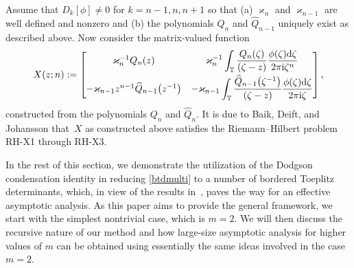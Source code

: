 \documentclass[pdftex]{sigma}
\numberwithin{equation}{section}
\newcommand{\T}{{\mathbb T}}
\newcommand{\ze}{\zeta}
\newcommand{\ii}{{\rm i}}
\newcommand{\dd}{{\rm d}}
\begin{document}
	
	
	Assume that $D_k[\phi] \neq 0$ for $k=n-1, n, n+1$ so that (a) $\varkappa_n$ and $\varkappa_{n-1}$ are well defined and nonzero and (b) the polynomials $Q_n$ and $\widehat{Q}_{n-1}$ uniquely exist as described above. Now consider the matrix-valued function
	\begin{equation}\label{Toeplitz-OP-solution}
		X(z;n):=\begin{bmatrix}
			\varkappa_n^{-1} Q_n(z) & \displaystyle \varkappa^{-1}_n \int_{\T} \frac{Q_n(\ze)}{(\ze-z)} \frac{\phi(\ze)\dd \ze}{2\pi \ii \ze^n} \vspace{1mm}\\
			-\varkappa_{n-1}z^{n-1}\widehat{Q}_{n-1}\big(z^{-1}\big) & \displaystyle -\varkappa_{n-1} \int_{\T} \frac{\widehat{Q}_{n-1}\big(\ze^{-1}\big)}{(\ze-z)} \frac{\phi(\ze)\dd \ze}{2\pi \ii \ze}
		\end{bmatrix},
	\end{equation}
	constructed from the polynomials $Q_n$ and $\widehat{Q}_n$. It is due to Baik, Deift, and Johansson \cite{BDJ} that~$X$ as constructed above satisfies the Riemann--Hilbert problem {\rm RH-X1} through {\rm RH-X3}.
	
In the rest of this section, we demonstrate the utilization of the Dodgson condensation identity in reducing \eqref{btdmulti} to a number of bordered Toeplitz determinants, which, in view of the results in~\cite{BEGIL}, paves the way for an effective asymptotic analysis. As this paper aims to provide the general framework, we start with the simplest nontrivial case, which is $m=2$. We will then discuss the recursive nature of our method and how large-size asymptotic analysis for higher values of $m$ can be obtained using essentially the same ideas involved in the case $m=2$.
	
\end{document}
